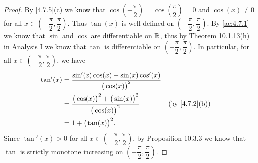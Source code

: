 \begin{proof}
  By \cref{4.7.5}(c) we know that \(\cos(-\dfrac{\pi}{2}) = \cos(\dfrac{\pi}{2}) = 0\) and \(\cos(x) \neq 0\) for all \(x \in (-\dfrac{\pi}{2}, \dfrac{\pi}{2})\).
  Thus \(\tan(x)\) is well-defined on \((-\dfrac{\pi}{2}, \dfrac{\pi}{2})\).
  By \cref{ac:4.7.1} we know that \(\sin\) and \(\cos\) are differentiable on \(\mathbb{R}\), thus by Theorem 10.1.13(h) in Analysis I we know that \(\tan\) is differentiable on \((-\dfrac{\pi}{2}, \dfrac{\pi}{2})\).
  In particular, for all \(x \in (-\dfrac{\pi}{2}, \dfrac{\pi}{2})\), we have
  \begin{align*}
    \tan'(x) & = \dfrac{\sin'(x) \cos(x) - \sin(x) \cos'(x)}{\big(\cos(x)\big)^2}                                        \\
             & = \dfrac{\big(\cos(x)\big)^2 + \big(\sin(x)\big)^2}{\big(\cos(x)\big)^2} &  & \text{(by \cref{4.7.2}(b))} \\
             & = 1 + \big(\tan(x)\big)^2.
  \end{align*}
  Since \(\tan'(x) > 0\) for all \(x \in (-\dfrac{\pi}{2}, \dfrac{\pi}{2})\), by Proposition 10.3.3 we know that \(\tan\) is strictly monotone increasing on \((-\dfrac{\pi}{2}, \dfrac{\pi}{2})\).


\end{proof}
